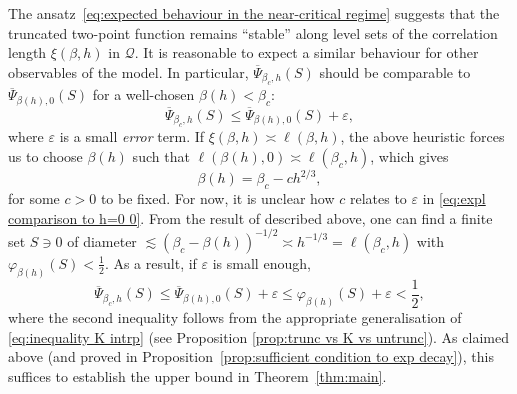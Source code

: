\documentclass[11pt,a4paper]{article}
\numberwithin{equation}{section}
\theoremstyle{plain}
\theoremstyle{definition}
\begin{document}
The ansatz~\eqref{eq:expected behaviour in the near-critical regime} suggests
that the truncated two-point function remains ``stable'' along level sets of
the correlation length $\xi(\beta,h)$ in $\mathcal Q$. It is reasonable to expect a similar behaviour for other 
observables of the model. In particular, $\overline{\Psi}_{\beta_c,h}(S)$ 
should be comparable to $\overline{\Psi}_{\beta(h),0}(S)$ for a 
well-chosen $\beta(h)<\beta_c$:
\begin{equation}\label{eq:expl comparison to h=0 0}
	\overline{\Psi}_{\beta_c,h}(S)\leq \overline{\Psi}_{\beta(h),0}(S)+\varepsilon,
\end{equation}
where $\varepsilon$ is a small \emph{error} term. If $\xi(\beta,h)\asymp \ell(\beta,h)$, the above heuristic forces us to choose $\beta(h)$ such that $\ell(\beta(h),0)\asymp\ell(\beta_c,h)$, which gives
\begin{equation}
    \beta(h)=\beta_c-ch^{2/3},
\end{equation}
for some $c>0$ to be fixed. For now, it is unclear how $c$ relates to $\varepsilon$ in \eqref{eq:expl comparison to h=0 0}. From the result of \cite{DuminilPanis2024newLB} described above, one can find a finite 
set $S\ni 0$ of diameter $\lesssim(\beta_c-\beta(h))^{-1/2}\asymp h^{-1/3}=\ell(\beta_c,h)$ 
with $\varphi_{\beta(h)}(S)<\tfrac{1}{2}$. As a result, if $\varepsilon$ is small enough,
\begin{equation}\label{eq:expl comparison to h=0 1}
    \overline{\Psi}_{\beta_c,h}(S)
    \leq\overline{\Psi}_{\beta(h),0}(S)+\varepsilon
    \leq\varphi_{\beta(h)}(S)+\varepsilon
    <\frac{1}{2},
\end{equation}
where the second inequality follows from the appropriate generalisation of \eqref{eq:inequality K intrp} (see Proposition \ref{prop:trunc vs K vs untrunc}). As claimed above (and proved in 
Proposition~\ref{prop:sufficient condition to exp decay}), this suffices 
to establish the upper bound in Theorem~\ref{thm:main}.
\end{document}
